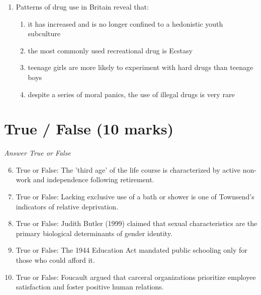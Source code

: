 \documentclass[12pt]{article}
\begin{document}
\begin{enumerate}[label=\arabic*.]
\begin{enumerate}[label=(\alph*)]
    \item finding out which topics are important to the respondents
    \item testing out your computer and printer
    \item identifying any problems with the question wording and routing
    \item deciding which respondents to leave out of the final sample
\end{enumerate}
\item Patterns of drug use in Britain reveal that:
\begin{enumerate}[label=(\alph*)]
    \item it has increased and is no longer confined to a hedonistic youth subculture
    \item the most commonly used recreational drug is Ecstasy
    \item teenage girls are more likely to experiment with hard drugs than teenage boys
    \item despite a series of moral panics, the use of illegal drugs is very rare
\end{enumerate}
\end{enumerate}

\section*{True / False (10 marks)}
\textit{Answer True or False}
\begin{enumerate}[label=\arabic*.]
\setcounter{enumi}{5}
\item True or False: The 'third age' of the life course is characterized by active non-work and independence following retirement.
\item True or False: Lacking exclusive use of a bath or shower is one of Townsend's indicators of relative deprivation.
\item True or False: Judith Butler (1999) claimed that sexual characteristics are the primary biological determinants of gender identity.
\item True or False: The 1944 Education Act mandated public schooling only for those who could afford it.
\item True or False: Foucault argued that carceral organizations prioritize employee satisfaction and foster positive human relations.
\end{enumerate}
\end{document}
